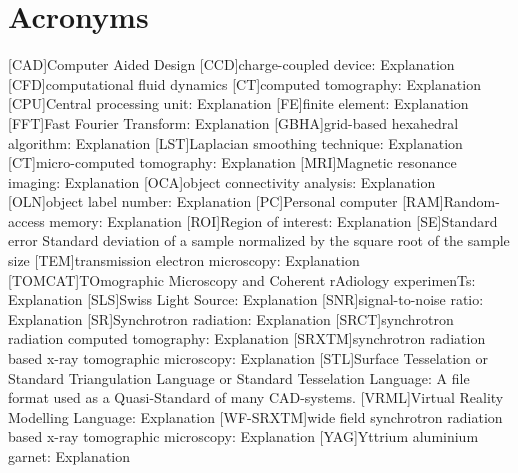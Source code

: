     \chapter*{Acronyms}
    \begin{acronym}
		[CAD]{Computer Aided Design}
		[CCD]{charge-coupled device}: Explanation
		[CFD]{computational fluid dynamics}
		[CT]{computed tomography}: Explanation
		[CPU]{Central processing unit}: Explanation
		[FE]{finite element}: Explanation
		[FFT]{Fast Fourier Transform}: Explanation
		{grid-based hexahedral algorithm}: Explanation
		[LST]{Laplacian smoothing technique}: Explanation
		[\micro CT]{micro-computed tomography}: Explanation
		[MRI]{Magnetic resonance imaging}: Explanation
		[OCA]{object connectivity analysis}: Explanation
		[OLN]{object label number}: Explanation
		[PC]{Personal computer}
		[RAM]{Random-access memory}: Explanation
		[ROI]{Region of interest}: Explanation
		[SE]{Standard error} Standard deviation of a sample normalized by the square root of the sample size 
		[TEM]{transmission electron microscopy}: Explanation
		[TOMCAT]{TOmographic Microscopy and Coherent rAdiology experimenTs}: Explanation
		[SLS]{Swiss Light Source}: Explanation
		[SNR]{signal-to-noise ratio}: Explanation
		[SR]{Synchrotron radiation}: Explanation
		{synchrotron radiation computed tomography}: Explanation
		[SRXTM]{synchrotron radiation based x-ray tomographic microscopy}: Explanation
		[STL]{Surface Tesselation or Standard Triangulation Language or Standard Tesselation Language}: A file format used as a Quasi-Standard of many \acs{CAD}-systems.
		{Virtual Reality Modelling Language}: Explanation
		[WF-SRXTM]{wide field synchrotron radiation based x-ray tomographic microscopy}: Explanation
		[YAG]{Yttrium aluminium garnet}: Explanation
    \end{acronym}                     
\endgroup

\cleardoublepage